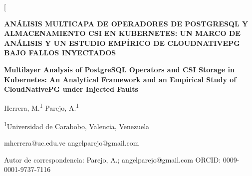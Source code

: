 \documentclass[12pt,twocolumn,letterpaper]{article}
\begin{document}
\twocolumn[{%
\begin{@twocolumnfalse}
\begin{center}
{\fontsize{14}{17}\selectfont\bfseries
ANÁLISIS MULTICAPA DE OPERADORES DE POSTGRESQL Y ALMACENAMIENTO CSI EN KUBERNETES: UN MARCO DE ANÁLISIS Y UN ESTUDIO EMPÍRICO DE CLOUDNATIVEPG BAJO FALLOS INYECTADOS\par}

\vspace{1em}
{\fontsize{12}{15}\selectfont\bfseries
Multilayer Analysis of PostgreSQL Operators and CSI Storage in Kubernetes: An Analytical Framework and an Empirical Study of CloudNativePG under Injected Faults\par}

\vspace{1.2em}
{\normalsize Herrera, M.\textsuperscript{1} \quad Parejo, A.\textsuperscript{1}\par}
\vspace{0.3em}
{\small \textsuperscript{1}Universidad de Carabobo, Valencia, Venezuela\par}
{\small mherrera@uc.edu.ve \quad angelparejo@gmail.com\par}
{\small *Autor de correspondencia: Parejo, A.; angelparejo@gmail.com \quad ORCID: 0009-0001-9737-7116\par}
\end{center}


\end{@twocolumnfalse}}
\end{document}
